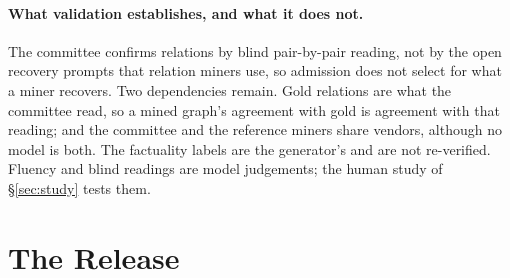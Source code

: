 \documentclass[11pt]{article}
\begin{document}
\begin{table}[t]
\centering\scriptsize
\rdTable
\caption{\textbf{A filler the committee rejected and the one that replaced it} (family
\rdFamily,  slot joining $a_{\rdXPos}$: ``\rdX'' and $a_{\rdYPos}$: ``\rdY''). Raters
see the response with the filler in place and the two claims, not the intended link. The first
filler draws the intended incompatibility, but two raters also read a link to a third statement
(the ``since \ldots'' clause), so it is rejected and regenerated; the second is read as intended
by a majority. Readings are the committee's verbatim outputs.}
\label{tab:readings}
\end{table}

\paragraph{What validation establishes, and what it does not.} The committee confirms relations
by blind pair-by-pair reading, not by the open recovery prompts that relation miners use, so
admission does not select for what a miner recovers. Two dependencies remain. Gold relations are
what the committee read, so a mined graph's agreement with gold is agreement with that reading;
and the committee and the reference miners share vendors, although no model is both. The
factuality labels are the generator's and are not re-verified. Fluency and blind readings are
model judgements; the human study of \S\ref{sec:study} tests them.

\section{The Release}
\label{sec:release}
\end{document}
